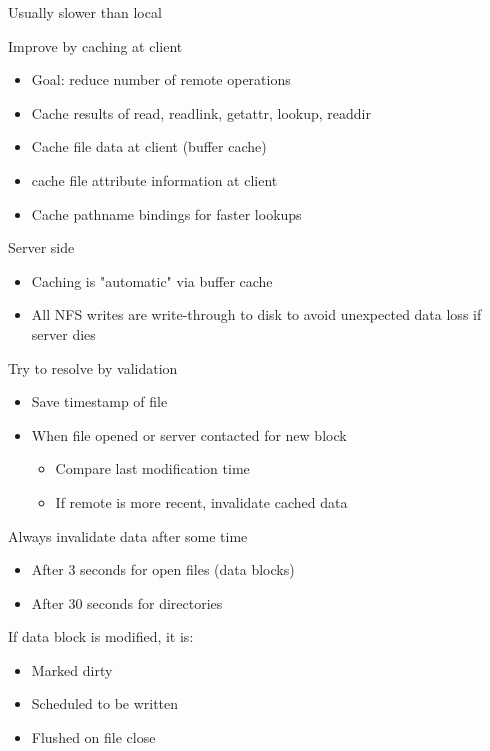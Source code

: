 \begin{slide}

	
	Usually slower than local
	\bigskip
	
	Improve by caching at client
	\begin{itemize}
		\item Goal: reduce number of remote operations
		\item Cache results of read, readlink, getattr, lookup, readdir
		\item Cache file data at client (buffer cache)
		\item cache file attribute information at client
		\item Cache pathname bindings for faster lookups
	\end{itemize}
	\bigskip
	
	Server side
	\begin{itemize}
		\item Caching is "automatic" via buffer cache
		\item All NFS writes are write-through to disk to avoid unexpected data loss if server dies
	\end{itemize}

\end{slide}

\begin{slide}
	
	
	Try to resolve by validation
	\begin{itemize}
		\item Save timestamp of file
		\item When file opened or server contacted for new block
		\begin{itemize}
			\item Compare last modification time
			\item If remote is more recent, invalidate cached data
		\end{itemize}
	\end{itemize}
	\bigskip
	
	Always invalidate data after some time
	\begin{itemize}
		\item After 3 seconds for open files (data blocks)
		\item After 30 seconds for directories
	\end{itemize}
	\bigskip
	
	If data block is modified, it is:
	\begin{itemize}
		\item Marked dirty
		\item Scheduled to be written
		\item Flushed on file close
	\end{itemize}
\end{slide}

